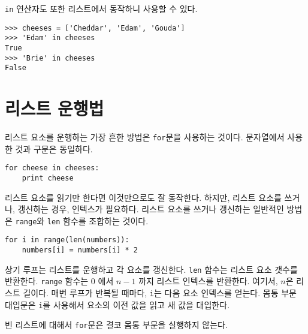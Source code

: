 

{\tt in} 연산자도 또한 리스트에서 동작하니 사용할 수 있다.

\beforeverb
\begin{verbatim}
>>> cheeses = ['Cheddar', 'Edam', 'Gouda']
>>> 'Edam' in cheeses
True
>>> 'Brie' in cheeses
False
\end{verbatim}
\afterverb

\section{리스트 운행법}

리스트 요소를 운행하는 가장 흔한 방법은 {\tt for}문을 사용하는 것이다.
문자열에서 사용한 것과 구문은 동일하다.

\beforeverb
\begin{verbatim}
for cheese in cheeses:
    print cheese
\end{verbatim}
\afterverb
%

리스트 요소를 읽기만 한다면 이것만으로도 잘 동작한다. 
하지만, 리스트 요소를 쓰거나, 갱신하는 경우, 인텍스가 필요하다. 
리스트 요소를 쓰거나 갱신하는 일반적인 방법은 {\tt range}와 {\tt len} 함수를 조합하는 것이다.


\beforeverb
\begin{verbatim}
for i in range(len(numbers)):
    numbers[i] = numbers[i] * 2
\end{verbatim}
\afterverb
%

상기 루프는 리스트를 운행하고 각 요소를 갱신한다. 
{\tt len} 함수는 리스트 요소 갯수를 반환한다.
{\tt range} 함수는 0 에서 $n-1$ 까지 리스트 인텍스를 반환한다. 
여기서, $n$은 리스트 길이다.
매번 루프가 반복될 때마다, {\tt i}는 다음 요소 인덱스를 얻는다. 
몸통 부문 대입문은 {\tt i}를 사용해서 요소의 이전 값을 읽고 새 값을 대입한다.


빈 리스트에 대해서 {\tt for}문은 결코 몸통 부문을 실행하지 않는다.

